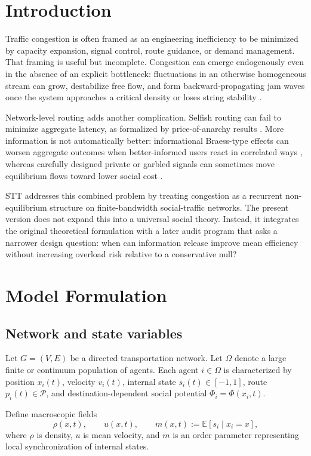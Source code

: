 \documentclass[11pt]{article}
\begin{document}
\section{Introduction}
Traffic congestion is often framed as an engineering inefficiency to be minimized by capacity expansion, signal control, route guidance, or demand management. That framing is useful but incomplete. Congestion can emerge endogenously even in the absence of an explicit bottleneck: fluctuations in an otherwise homogeneous stream can grow, destabilize free flow, and form backward-propagating jam waves once the system approaches a critical density or loses string stability \cite{Bando1995,Sugiyama2008,Helbing2001}.

Network-level routing adds another complication. Selfish routing can fail to minimize aggregate latency, as formalized by price-of-anarchy results \cite{Roughgarden2003}. More information is not automatically better: informational Braess-type effects can worsen aggregate outcomes when better-informed users react in correlated ways \cite{Acemoglu2018}, whereas carefully designed private or garbled signals can sometimes move equilibrium flows toward lower social cost \cite{Das2017}.

STT addresses this combined problem by treating congestion as a recurrent non-equilibrium structure on finite-bandwidth social-traffic networks. The present version does not expand this into a universal social theory. Instead, it integrates the original theoretical formulation with a later audit program that asks a narrower design question: when can information release improve mean efficiency without increasing overload risk relative to a conservative null?

\section{Model Formulation}
\subsection{Network and state variables}
Let $G=(V,E)$ be a directed transportation network. Let $\Omega$ denote a large finite or continuum population of agents. Each agent $i\in\Omega$ is characterized by position $x_i(t)$, velocity $v_i(t)$, internal state $s_i(t)\in[-1,1]$, route $p_i(t)\in\mathcal P$, and destination-dependent social potential $\Phi_i=\Phi(x_i,t)$.

Define macroscopic fields
\begin{equation}
\rho(x,t),\qquad u(x,t),\qquad m(x,t):=\mathbb E[s_i\mid x_i=x],
\end{equation}
where $\rho$ is density, $u$ is mean velocity, and $m$ is an order parameter representing local synchronization of internal states.
\end{document}
